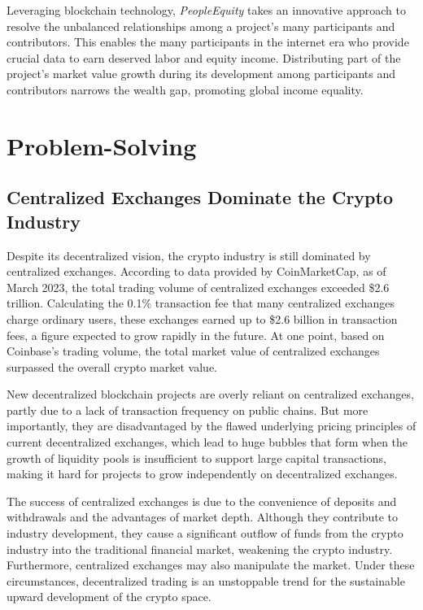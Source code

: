 \documentclass{article}
\begin{document}
Leveraging blockchain technology, \emph{PeopleEquity} takes an innovative approach to resolve the unbalanced relationships among a project’s many participants and contributors. This enables the many participants in the internet era who provide crucial data to earn deserved labor and equity income. Distributing part of the project's market value growth during its development among participants and contributors narrows the wealth gap, promoting global income equality.

\section{Problem-Solving}

\subsection{Centralized Exchanges Dominate the Crypto Industry}

Despite its decentralized vision, the crypto industry is still dominated by centralized exchanges. According to data provided by CoinMarketCap, as of March 2023, the total trading volume of centralized exchanges exceeded \$2.6 trillion. Calculating the 0.1\% transaction fee that many centralized exchanges charge ordinary users, these exchanges earned up to \$2.6 billion in transaction fees, a figure expected to grow rapidly in the future. At one point, based on Coinbase's trading volume, the total market value of centralized exchanges surpassed the overall crypto market value.

New decentralized blockchain projects are overly reliant on centralized exchanges,  partly due to a lack of transaction frequency on public chains. But more importantly, they are disadvantaged by the flawed underlying pricing principles of current decentralized exchanges, which lead to huge bubbles that form when the growth of liquidity pools is insufficient to support large capital transactions, making it hard for projects to grow independently on decentralized exchanges. 

The success of centralized exchanges is due to the convenience of deposits and withdrawals and the advantages of market depth. Although they contribute to industry development, they cause a significant outflow of funds from the crypto industry into the traditional financial market, weakening the crypto industry. Furthermore, centralized exchanges may also manipulate the market. Under these circumstances, decentralized trading is an unstoppable trend for the sustainable upward development of the crypto space.
\end{document}

